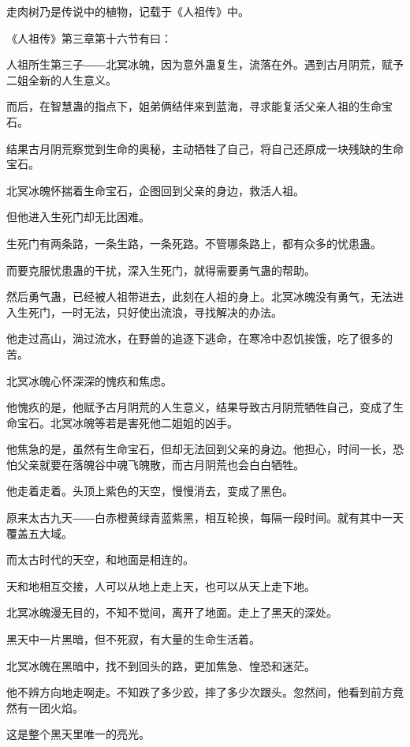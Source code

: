 
\begin{this_body}

走肉树乃是传说中的植物，记载于《人祖传》中。

《人祖传》第三章第十六节有曰：

人祖所生第三子――北冥冰魄，因为意外蛊复生，流落在外。遇到古月阴荒，赋予二姐全新的人生意义。

而后，在智慧蛊的指点下，姐弟俩结伴来到蓝海，寻求能复活父亲人祖的生命宝石。

结果古月阴荒察觉到生命的奥秘，主动牺牲了自己，将自己还原成一块残缺的生命宝石。

北冥冰魄怀揣着生命宝石，企图回到父亲的身边，救活人祖。

但他进入生死门却无比困难。

生死门有两条路，一条生路，一条死路。不管哪条路上，都有众多的忧患蛊。

而要克服忧患蛊的干扰，深入生死门，就得需要勇气蛊的帮助。

然后勇气蛊，已经被人祖带进去，此刻在人祖的身上。北冥冰魄没有勇气，无法进入生死门，一时无法，只好使出流浪，寻找解决的办法。

他走过高山，淌过流水，在野兽的追逐下逃命，在寒冷中忍饥挨饿，吃了很多的苦。

北冥冰魄心怀深深的愧疚和焦虑。

他愧疚的是，他赋予古月阴荒的人生意义，结果导致古月阴荒牺牲自己，变成了生命宝石。北冥冰魄等若是害死他二姐姐的凶手。

他焦急的是，虽然有生命宝石，但却无法回到父亲的身边。他担心，时间一长，恐怕父亲就要在落魄谷中魂飞魄散，而古月阴荒也会白白牺牲。

他走着走着。头顶上紫色的天空，慢慢消去，变成了黑色。

原来太古九天――白赤橙黄绿青蓝紫黑，相互轮换，每隔一段时间。就有其中一天覆盖五大域。

而太古时代的天空，和地面是相连的。

天和地相互交接，人可以从地上走上天，也可以从天上走下地。

北冥冰魄漫无目的，不知不觉间，离开了地面。走上了黑天的深处。

黑天中一片黑暗，但不死寂，有大量的生命生活着。

北冥冰魄在黑暗中，找不到回头的路，更加焦急、惶恐和迷茫。

他不辨方向地走啊走。不知跌了多少跤，摔了多少次跟头。忽然间，他看到前方竟然有一团火焰。

这是整个黑天里唯一的亮光。


\end{this_body}
